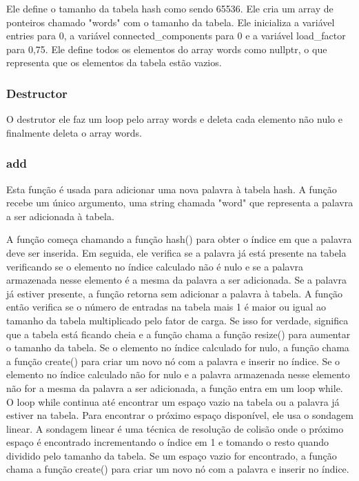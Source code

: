 \documentclass[a4paper,11pt]{article}
\begin{document}
    Ele define o tamanho da tabela hash como sendo 65536.
    Ele cria um array de ponteiros chamado "words" com o tamanho da tabela.
    Ele inicializa a variável entries para 0, a variável connected\_components para 0 e a variável load\_factor para 0,75.
    Ele define todos os elementos do array words como nullptr, o que representa que os elementos da tabela estão vazios.

    \subsubsection{Destructor}
O destrutor ele faz um loop pelo array words e deleta cada elemento não nulo e finalmente deleta o array words.
   
    \subsubsection{add}
    Esta função é usada para adicionar uma nova palavra à tabela hash. A função recebe um único argumento, uma string chamada "word" que representa a palavra a ser adicionada à tabela.

    A função começa chamando a função hash() para obter o índice em que a palavra deve ser inserida.
    Em seguida, ele verifica se a palavra já está presente na tabela verificando se o elemento no índice calculado não é nulo e se a palavra armazenada nesse elemento é a mesma da palavra a ser adicionada. Se a palavra já estiver presente, a função retorna sem adicionar a palavra à tabela.
    A função então verifica se o número de entradas na tabela mais 1 é maior ou igual ao tamanho da tabela multiplicado pelo fator de carga. Se isso for verdade, significa que a tabela está ficando cheia e a função chama a função resize() para aumentar o tamanho da tabela.
    Se o elemento no índice calculado for nulo, a função chama a função create() para criar um novo nó com a palavra e inserir no índice.
    Se o elemento no índice calculado não for nulo e a palavra armazenada nesse elemento não for a mesma da palavra a ser adicionada, a função entra em um loop while. O loop while continua até encontrar um espaço vazio na tabela ou a palavra já estiver na tabela. Para encontrar o próximo espaço disponível, ele usa o sondagem linear. A sondagem linear é uma técnica de resolução de colisão onde o próximo espaço é encontrado incrementando o índice em 1 e tomando o resto quando dividido pelo tamanho da tabela.
    Se um espaço vazio for encontrado, a função chama a função create() para criar um novo nó com a palavra e inserir no índice.
\end{document}
